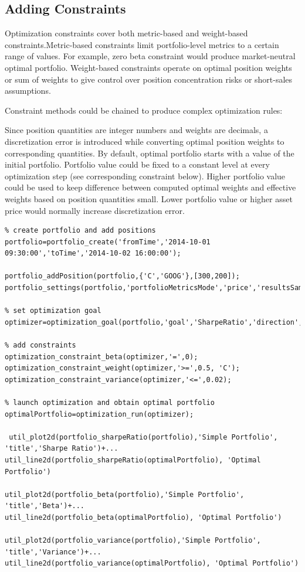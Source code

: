 \documentclass[letterpaper]{report}
\begin{document}
\subsection{Adding Constraints}
Optimization constraints cover both metric-based and weight-based
constraints.Metric-based constraints limit portfolio-level metrics to a certain
range of values. For example, zero beta constraint would produce market-neutral optimal portfolio.
Weight-based constraints operate on optimal position weights or sum of weights to 
give control over position concentration risks or short-sales assumptions.
\par
Constraint methods could be chained to produce complex optimization rules:
\par
Since position quantities are integer numbers and weights are decimals, a discretization error is introduced while converting optimal position weights to corresponding quantities. 
By default, optimal portfolio starts with a value of the initial portfolio. 
Portfolio value could be fixed to a constant level at every optimization step
(see corresponding constraint below).
Higher portfolio value could be used to keep difference between computed optimal weights and effective weights based on position quantities small.
Lower portfolio value or higher asset price would normally increase discretization error.

\begin{lstlisting}
% create portfolio and add positions
portfolio=portfolio_create('fromTime','2014-10-01 09:30:00','toTime','2014-10-02 16:00:00');

portfolio_addPosition(portfolio,{'C','GOOG'},[300,200]);
portfolio_settings(portfolio,'portfolioMetricsMode','price','resultsSamplingInterval','30m');

% set optimization goal
optimizer=optimization_goal(portfolio,'goal','SharpeRatio','direction','maximize');

% add constraints
optimization_constraint_beta(optimizer,'=',0);
optimization_constraint_weight(optimizer,'>=',0.5, 'C');
optimization_constraint_variance(optimizer,'<=',0.02);
 
% launch optimization and obtain optimal portfolio
optimalPortfolio=optimization_run(optimizer);

 util_plot2d(portfolio_sharpeRatio(portfolio),'Simple Portfolio', 'title','Sharpe Ratio')+...
util_line2d(portfolio_sharpeRatio(optimalPortfolio), 'Optimal Portfolio')

util_plot2d(portfolio_beta(portfolio),'Simple Portfolio', 'title','Beta')+...
util_line2d(portfolio_beta(optimalPortfolio), 'Optimal Portfolio')

util_plot2d(portfolio_variance(portfolio),'Simple Portfolio', 'title','Variance')+...
util_line2d(portfolio_variance(optimalPortfolio), 'Optimal Portfolio')
\end{lstlisting}
\end{document}
